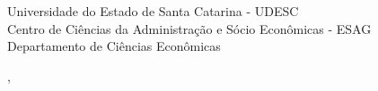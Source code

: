   \begin{capa}%
    \center
	\ABNTEXchapterfont\large{Universidade do Estado de Santa Catarina - UDESC \\ Centro de Ciências da Administração e Sócio Econômicas - ESAG \\ Departamento de Ciências Econômicas}

    \vfill
    \ABNTEXchapterfont\bfseries\LARGE\imprimirtitulo
    \vfill

	\ABNTEXchapterfont\large\imprimirautor
	\vfill
%
		
    \large\imprimirlocal, \large\imprimirdata

    \vspace*{1cm}
  \end{capa}
